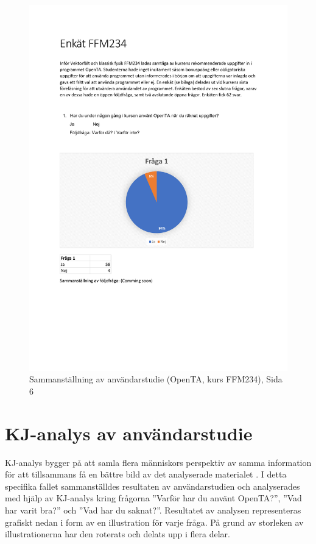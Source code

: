 \begin{figure}[hbtp]
    \centering
    \includegraphics[page=6,scale=0.85]{appendix/form_survey.pdf}
    \caption*{Sammanställning av användarstudie (OpenTA, kurs FFM234), Sida 6}
    \label{fig:openfor6}
\end{figure}

\section{KJ-analys av användarstudie}
\label{app:kjOpenTA}

KJ-analys bygger på att samla flera människors perspektiv av samma information för att tillsammans få en bättre bild av det analyserade materialet \cite{kj}. I detta specifika fallet sammanställdes resultaten av användarstudien och analyserades med hjälp av KJ-analys kring frågorna ''Varför har du använt OpenTA?'', ''Vad har varit bra?'' och ''Vad har du saknat?''. Resultatet av analysen representeras grafiskt nedan i form av en illustration för varje fråga. På grund av storleken av illustrationerna har den roterats och delats upp i flera delar. 

